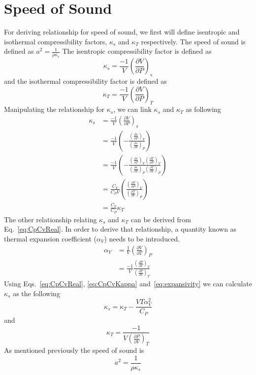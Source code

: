\documentclass[11pt]{article}
\begin{document}
\section{Speed of Sound}\label{sec:SpeedofSound}
For deriving relationship for speed of sound, we first will define isentropic and isothermal compressibility factors, $\kappa_{s}$ and $\kappa_{T}$ respectively. The speed of sound is defined as $a^{2} = \frac{1}{\rho \kappa_{s}}$
The isentropic compressibility factor is defined as 
\begin{equation}
\kappa_{s} = \frac{-1}{V} \left(\frac{\partial V}{\partial P} \right)_{s} 
\end{equation}
and the isothermal compressibility factor is defined as 
\begin{equation}
\kappa_{T} = \frac{-1}{V} \left(\frac{\partial V}{\partial P} \right)_{T}
\end{equation}
Manipulating the relationship for $\kappa_{s}$, we can link $\kappa_{s}$ and $\kappa_{T}$ as following 
\begin{align}
\kappa_{s} &= \frac{-1}{V} \left(\frac{\partial V}{\partial P} \right)_{s} \\
           &= \frac{-1}{V} \left(-\frac{\left(\frac{\partial s}{\partial P}\right)_V}{\left(\frac{\partial s}{\partial V} \right)_P} \right) \\
           &= \frac{-1}{V} \left( -\frac{\left(\frac{\partial s}{\partial T}\right)_V \left(\frac{\partial T}{\partial P}\right)_V}{\left(\frac{\partial s}{\partial T} \right)_P \left(\frac{\partial T}{\partial V} \right)_P}  \right) \\
           &= \frac{C_{V}}{C_{P}V} \left(\frac{\left(\frac{\partial T}{\partial P}\right)_V}{\left(\frac{\partial T}{\partial V} \right)_P}  \right) \\
           & = \frac{C_{V}}{C_{P}}\kappa_{T} 
           \label{eq:CpCvKappa}
           \end{align}
The other relationship relating $\kappa_{s}$ and $\kappa_{T}$ can be derived from Eq.~\ref{eq:CpCvReal}. In order to derive that relationship, a quantity known as thermal expansion coefficient ($\alpha_{V}$) needs to be introduced. 
\begin{align}
\alpha_{V} &= \frac{1}{V} \left(\frac{\partial V}{\partial T} \right)_{P} \\
           &= \frac{-1}{V} \frac{\left(\frac{\partial P}{\partial T} \right)_{V}}{\left(\frac{\partial P}{\partial V} \right)_{T} }
           \label{eq:expansivity}
           \end{align}
       Using Eqs.~\ref{eq:CpCvReal}, \ref{eq:CpCvKappa} and~\ref{eq:expansivity} we can calculate $\kappa_{s}$ as the following 
   \begin{equation}
    \kappa_{s} = \kappa_{T} - \frac{V T \alpha_{V}^{2}}{C_{P}}
    \end{equation}
    and 
       \begin{equation}
    \kappa_{T} =  \frac{-1}{V \left(\frac{\partial P}{\partial V} \right)_{T} }
    \end{equation}
    As mentioned previously the speed of sound is 
     \begin{equation}
     a^{2} = \frac{1}{\rho \kappa_{s}}
     \end{equation}
\end{document}

